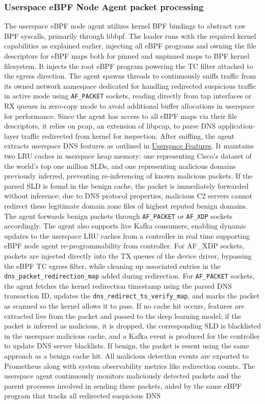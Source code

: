 \documentclass [11pt, proquest] {uwthesis}[2020/02/24]
\begin{document}
\subsubsection{\textbf{Userspace eBPF Node Agent packet processing}}
\label{active:sec2}
The userspace eBPF node agent utilizes kernel BPF bindings to abstract raw BPF syscalls, primarily through libbpf. The loader runs with the required kernel capabilities as explained earlier, injecting all eBPF programs and owning the file descriptors for eBPF maps both for pinned and unpinned maps to BPF kernel filesystem. It injects the root eBPF program powering the TC filter attached to the egress direction. The agent spawns threads to continuously sniffs traffic from its owned network namespace dedicated for handling redirected suspicious traffic in active mode using \texttt{AF\_PACKET} sockets, reading directly from tap interfaces or RX queues in zero-copy mode to avoid additional buffer allocations in userspace for performance. Since the agent has access to all eBPF maps via their file descriptors, it relies on pcap, an extension of libpcap, to parse DNS application-layer traffic redirected from kernel for inspection. After sniffing, the agent extracts userspace DNS features as outlined in \hyperref[sec:feature-userspace]{Userspace Features}. It maintains two LRU caches in userspace heap memory: one representing Cisco’s dataset of the world’s top one million SLDs, and one representing malicious domains previously inferred, preventing re-inferencing of known malicious packets. If the parsed SLD is found in the benign cache, the packet is immediately forwarded without inference; due to DNS protocol properties, malicious C2 servers cannot redirect these legitimate domain zone files of highest reputed benign domains. The agent forwards benign packets through \texttt{AF\_PACKET} or \texttt{AF\_XDP} sockets accordingly. The agent also supports live Kafka consumers, enabling dynamic updates to the userspace LRU caches from a controller in real time supporting eBPF node agent re-programmability from controller. For AF\_XDP sockets, packets are injected directly into the TX queues of the device driver, bypassing the eBPF TC egress filter, while cleaning up associated entries in the \texttt{dns\_packet\_redirection\_map} added during redirection. For \texttt{AF\_PACKET} sockets, the agent fetches the kernel redirection timestamp using the parsed DNS transaction ID, updates the \texttt{dns\_redirect\_ts\_verify\_map}, and marks the packet as scanned so the kernel allows it to pass. If no cache hit occurs, features are extracted live from the packet and passed to the deep learning model; if the packet is inferred as malicious, it is dropped, the corresponding SLD is blacklisted in the userspace malicious cache, and a Kafka event is produced for the controller to update DNS server blacklists. If benign, the packet is resent using the same approach as a benign cache hit. All malicious detection events are exported to Prometheus along with system observability metrics like redirection counts. The userspace agent continuously monitors maliciously detected packets and the parent processes involved in sending these packets, aided by the same eBPF program that tracks all redirected suspicious DNS 
\end{document}
